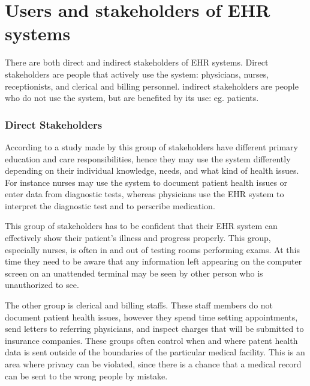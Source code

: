 \documentclass[14pt]{article}
\begin{document}
\newpage

\section{Users and stakeholders of \gls{EHR} systems} 
\label{sec:People}
There are both direct and indirect stakeholders of \gls{EHR} systems. Direct stakeholders are people that actively use the system: physicians, nurses, receptionists, and clerical and billing personnel. indirect stakeholders are people who do not use the system, but are benefited by its use: eg. patients.

\subsubsection{Direct Stakeholders}
\label{sec:peopleDirect}
According to a study made by \cite{Janols} this group of stakeholders have different primary education and care responsibilities, hence they may use the system differently depending on their individual knowledge, needs, and what kind of health issues. For instance nurses may use the system to document patient health issues or enter data from diagnostic tests, whereas physicians use the \gls{EHR} system to interpret the diagnostic test and to perscribe medication. 

This group of stakeholders has to be confident that their \gls{EHR} system can effectively show their patient’s illness and progress properly. This group, especially nurses, is often in and out of testing rooms performing exams. At this time they need to be aware that any information left appearing on the computer screen on an unattended terminal may be seen by other person who is unauthorized to see. 

The other group is clerical and billing staffs. These staff members do not document patient health issues, however they spend time setting appointments, send letters to referring physicians, and inspect charges that will be submitted to insurance companies. These groups often control when and where patent health data is sent outside of the boundaries of the particular medical facility. This is an area where privacy can be violated, since there is a chance that a medical record can be sent to the wrong people by mistake. 
\end{document}
